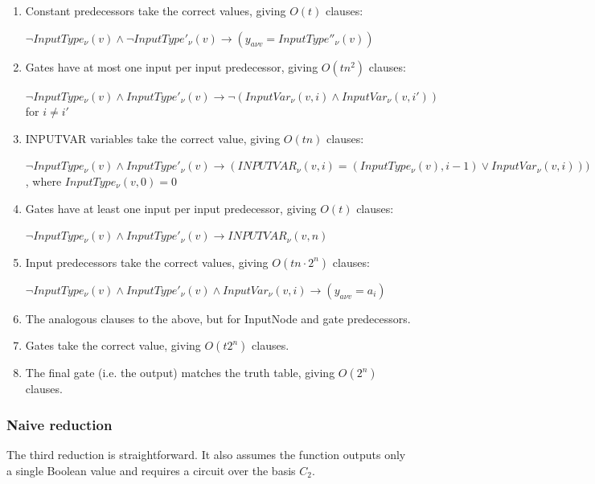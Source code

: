 \documentclass{article}
\begin{document}
\begin{enumerate}

  \item Constant predecessors take the correct values, giving $O(t)$ clauses:

  $\neg InputType_\nu(v) \land \neg InputType'_\nu(v) \rightarrow (y_{a \nu v} = InputType''_\nu(v))$

  \item Gates have at most one input per input predecessor, giving $O(tn^2)$ clauses:

  $\neg InputType_\nu(v) \land InputType'_\nu(v) \rightarrow \neg (InputVar_\nu(v,i) \land InputVar_\nu(v,i'))$ for $i \neq i'$

  \item INPUTVAR variables take the correct value, giving $O(tn)$ clauses:

  $\neg InputType_\nu(v) \land InputType'_\nu(v) \rightarrow (INPUTVAR_\nu(v,i) = (InputType_\nu(v),i-1) \lor InputVar_\nu(v,i)))$, where $InputType_\nu(v,0) = 0$

  \item Gates have at least one input per input predecessor, giving $O(t)$ clauses:

  $\neg InputType_\nu(v) \land InputType'_\nu(v) \rightarrow INPUTVAR_\nu(v,n)$

  \item Input predecessors take the correct values, giving $O(tn \cdot 2^n)$ clauses:

  $\neg InputType_\nu(v) \land InputType'_\nu(v) \land InputVar_\nu(v,i) \rightarrow (y_{a \nu v} = a_i)$

  \item The analogous clauses to the above, but for InputNode and gate predecessors. 

  \item Gates take the correct value, giving $O(t2^n)$ clauses.

  \item The final gate (i.e. the output) matches the truth table, giving $O(2^n)$ clauses.

\end{enumerate}

\subsubsection{Naive reduction}

The third reduction is straightforward. It also assumes the function outputs only a single Boolean value and requires a circuit over the basis \(C_2\).
\end{document}
